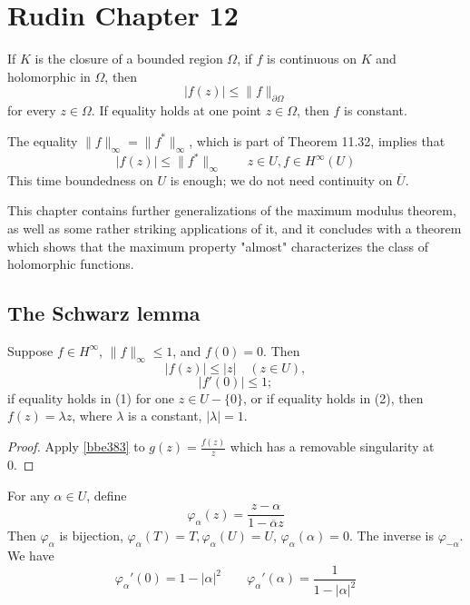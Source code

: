 \section{Rudin Chapter 12}

\begin{theorem}
If $K$ is the closure of a bounded region $\Omega$, if $f$ is continuous on $K$ and holomorphic in $\Omega$, then
\[
|f(z)| \leq\|f\|_{\partial \Omega}
\]for every $z \in \Omega$. If equality holds at one point $z \in \Omega$, then $f$ is constant.\label{bbe383}
\end{theorem}

The equality $\lVert f \rVert_{\infty}=\lVert f ^{*}\rVert_{\infty}$, which is part of Theorem 11.32, implies that
\[
\lvert f(z) \rvert \leq \lVert f^{*} \rVert _{\infty}\qquad z\in U,f\in H^{\infty}(U)
\]
This time boundedness on $U$ is enough; we do not need continuity on $\overline{U}$.

This chapter contains further generalizations of the maximum modulus theorem, as well as some rather striking applications of it, and it concludes with a theorem which shows that the maximum property "almost" characterizes the class of holomorphic functions.

\subsection{The Schwarz lemma}

\begin{theorem}
Suppose $f \in H^\infty$, $\|f\|_\infty \leq 1$, and $f(0) = 0$. Then
\[
|f(z)| \leq |z| \quad (z \in U),
\]\[
|f'(0)| \leq 1;
\]if equality holds in (1) for one $z \in U - \{0\}$, or if equality holds in (2), then $f(z) = \lambda z$, where $\lambda$ is a constant, $|\lambda| = 1$.\label{8304d0}
\end{theorem}

\begin{proof}
Apply \cref{bbe383} to $g(z)=\frac{f(z)}{z}$ which has a removable singularity at 0.
\end{proof}

For any $\alpha\in U$, define
\[
\varphi_{\alpha}(z)=\frac{z-\alpha}{1-\overline{\alpha}z}
\]
Then $\varphi_{\alpha}$ is bijection, $\varphi_{\alpha}(T)=T,\varphi_{\alpha}(U)=U$, $\varphi_{\alpha}(\alpha)=0$. The inverse is $\varphi_{-\alpha}$. We have
\begin{equation}
\varphi_{\alpha}'(0)=1-\lvert \alpha \rvert ^2\qquad \varphi_{\alpha}'(\alpha)=\frac{1}{1-\lvert \alpha \rvert ^2}
\label{6e6ce3}
\end{equation}

